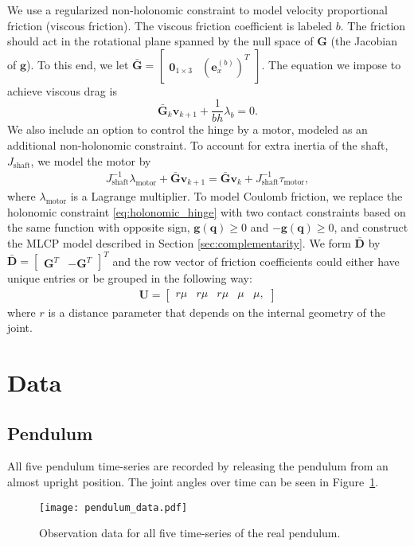 \documentclass[preprint,12pt]{elsarticle}
\let\vec\bm
\let\mat\mathbf
\newcommand\figref{Figure~\ref}
\numberwithin{equation}{section}
\begin{document}
We use a regularized non-holonomic constraint to model velocity proportional friction (viscous friction).
The viscous friction coefficient is labeled $b$.
The friction should act in the rotational plane spanned by the null space of $\mat{G}$ (the Jacobian of $\vec{g}$).
To this end, we let $\bar{\mat{G}} = \begin{bmatrix} \vec{0}_{1 \times 3} & (\vec{e}_x^{(b)})^T\end{bmatrix}$.
The equation we impose to achieve viscous drag is
\begin{equation}
    \bar{\mat{G}}_k \vec{v}_{k+1} + \frac{1}{b h}\lambda_b = 0.
\end{equation}
We also include an option to control the hinge by a motor, modeled as an additional non-holonomic constraint.
To account for extra inertia of the shaft, $J_{\text{shaft}}$, we model the motor by
\begin{eqnarray}
    J_{\text{shaft}}^{-1} \lambda_{\text{motor}} + \bar{\mat{G}} \vec{v}_{k+1}= \bar{\mat{G}} \vec{v}_{k} + J_{\text{shaft}}^{-1} \tau_{\text{motor}},
\end{eqnarray}
where $\lambda_{\text{motor}}$ is a Lagrange multiplier.
To model Coulomb friction, we replace the holonomic constraint \eqref{eq:holonomic_hinge} with two contact constraints based on the same function with opposite sign, $\vec{g}(\vec{q}) \geq 0$ and $-\vec{g}(\vec{q}) \geq 0$, and construct the MLCP model described in Section \ref{sec:complementarity}.
We form $\bar{\mat{D}}$ by $\bar{\mat{D}} = \begin{bmatrix}
    \mat{G}^T & -\mat{G}^T
\end{bmatrix}^T$ and the row vector of friction coefficients could either have unique entries or be grouped in the following way:
\begin{eqnarray}
    \mat{U} = \begin{bmatrix}
        r \mu & r \mu & r \mu & \mu & \mu,
    \end{bmatrix}
\end{eqnarray}
where $r$ is a distance parameter that depends on the internal geometry of the joint.

\section{Data}
\subsection{Pendulum}
\label{appendix:pendulum}
All five pendulum time-series are recorded by releasing the pendulum from an almost upright position.
The joint angles over time can be seen in \figref{fig:pendulum_time_series}.
\begin{figure}[ht]
    \texttt{[image: pendulum\_data.pdf]}
    \caption{Observation data for all five time-series of the real pendulum.}
    \label{fig:pendulum_time_series}
\end{figure}
\end{document}
